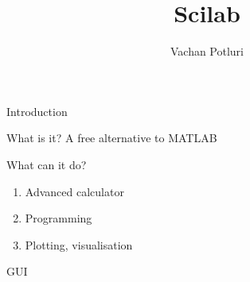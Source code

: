 \documentclass[%
    10pt,
    xcolor={dvipsnames},
]{beamer}
\title{Scilab}
\author[Vachan Potluri]{%
    Vachan Potluri\\
    \email{vachanpotluri@iitb.ac.in}
}
\begin{document}
\begin{frame}
    \maketitle
\end{frame}

\begin{frame}{Introduction}
    \begin{block}{What is it?}
        A free alternative to MATLAB
    \end{block}
    \begin{block}{What can it do?}
        \begin{enumerate}
            \item Advanced calculator
            \item Programming
            \item Plotting, visualisation
        \end{enumerate}
    \end{block}
\end{frame}

\begin{frame}
    \begin{shoutbox}
        GUI
    \end{shoutbox}
\end{frame}
\end{document}
